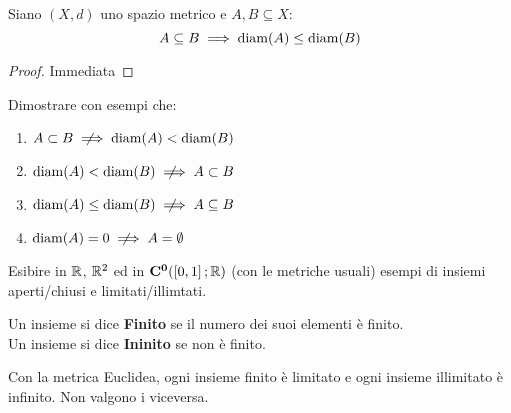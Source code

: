 \begin{proposition}
	Siano $(X,d)$ uno spazio metrico e $A,B\subseteq X$:
	\[A \subseteq B \implies \operatorname{diam}(A) \leq \operatorname{diam}(B)\]
	\begin{proof}
		Immediata %
	\end{proof}
\end{proposition}
\begin{exercise}
	Dimostrare con esempi che:
	\begin{enumerate}
		\item $A \subset B \notimplies \diam(A) < \diam(B)$
		\item $\diam(A) < \diam(B) \notimplies A \subset B$
		\item $\diam(A) \leq \diam(B) \notimplies A \subseteq B$
		\item $\diam(A) = 0 \notimplies A = \emptyset$ %
	\end{enumerate}
\end{exercise}
\begin{exercise}
	Esibire in $\mathbb{R}$, $\mathbb{R}^2$ ed in $\mathbf{C^{0}}(\left[0,1\right]; \mathbb{R})$ (con le metriche usuali) esempi di insiemi aperti/chiusi e limitati/illimtati.
\end{exercise}

\begin{definition}
	Un insieme si dice \textbf{Finito} se il numero dei suoi elementi è finito.\\
	Un insieme si dice \textbf{Ininito} se non è finito.
\end{definition}
\begin{observation}
	Con la metrica Euclidea, ogni insieme finito è limitato e ogni insieme illimitato è infinito. Non valgono i viceversa.
\end{observation}

\newpage
